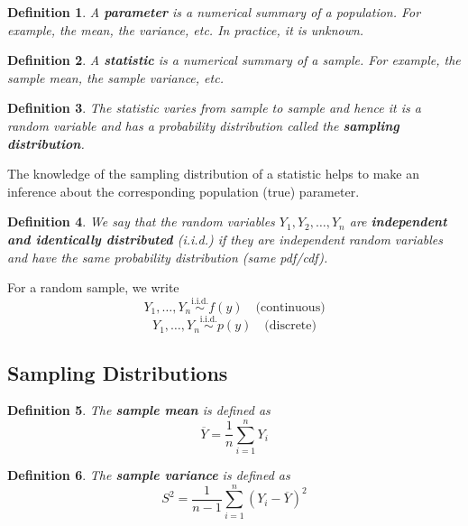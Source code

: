\documentclass[a4paper,12pt]{article}
\theoremstyle{nonitalic}
\newtheorem{definition}{Definition}[subsection]
\begin{document}
    \begin{definition}
        A \textbf{parameter} is a numerical summary of a population. For example, the mean, the variance, etc. In practice, it is unknown.
    \end{definition}

    \bigskip

    \begin{definition}
        A \textbf{statistic} is a numerical summary of a sample. For example, the sample mean, the sample variance, etc.
    \end{definition}

    \bigskip

    \begin{definition}
        The statistic varies from sample to sample and hence it is a random variable and has a probability distribution called the \textbf{sampling distribution}.
    \end{definition}

    \bigskip

    The knowledge of the sampling distribution of a statistic helps to make an inference about the corresponding population (true) parameter.

    \bigskip

    \begin{definition}
        We say that the random variables $Y_1, Y_2, \ldots, Y_n$ are \textbf{independent and identically distributed} (i.i.d.) if they are independent random variables and have the same probability distribution (same pdf/cdf).
    \end{definition}

    \bigskip

    For a random sample, we write
    \[
        Y_1, \ldots, Y_n \overset{\text{i.i.d.}}{\sim} f(y) \quad \text{(continuous)}
    \]
    \[
        Y_1, \ldots, Y_n \overset{\text{i.i.d.}}{\sim} p(y) \quad \text{(discrete)}
    \]
    \newpage

    \subsection{Sampling Distributions}
    
    \begin{definition}
        The \textbf{sample mean} is defined as
        \[
            \overline{Y} = \frac{1}{n} \sum_{i=1}^{n} Y_i
        \]
    \end{definition}

    \begin{definition}
        The \textbf{sample variance} is defined as
        \[
            S^2 = \frac{1}{n-1} \sum_{i=1}^{n} (Y_i - \overline{Y})^2
        \]
    \end{definition}
\end{document}
